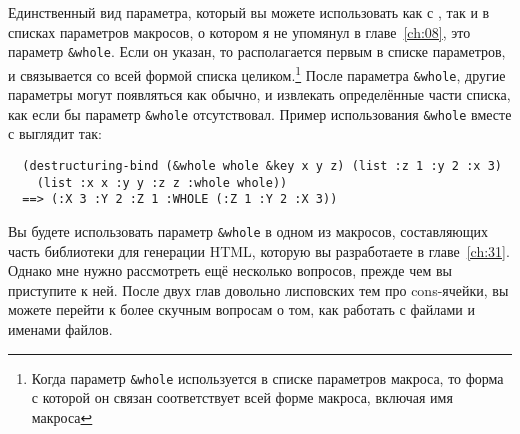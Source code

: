 Единственный вид параметра, который вы можете использовать как с
, так и в списках параметров макросов, о котором я не упомянул в
главе~\ref{ch:08}, это параметр \lstinline!&whole!. Если он указан, то располагается
первым в списке параметров, и связывается со всей формой списка целиком.\footnote{Когда
  параметр \lstinline!&whole! используется в списке параметров макроса, то форма с которой
  он связан соответствует всей форме макроса, включая имя макроса} После параметра
\lstinline!&whole!, другие параметры могут появляться как обычно, и извлекать определённые
части списка, как если бы параметр \lstinline!&whole! отсутствовал. Пример использования
\lstinline!&whole! вместе с  выглядит так:
  
\begin{verbatim}
  (destructuring-bind (&whole whole &key x y z) (list :z 1 :y 2 :x 3)
    (list :x x :y y :z z :whole whole))
  ==> (:X 3 :Y 2 :Z 1 :WHOLE (:Z 1 :Y 2 :X 3))
\end{verbatim}

Вы будете использовать параметр \lstinline!&whole! в одном из макросов, составляющих часть
библиотеки для генерации HTML, которую вы разработаете в главе~\ref{ch:31}.  Однако мне
нужно рассмотреть ещё несколько вопросов, прежде чем вы приступите к ней. После двух глав
довольно лисповских тем про cons-ячейки, вы можете перейти к более скучным вопросам о том,
как работать с файлами и именами файлов.






